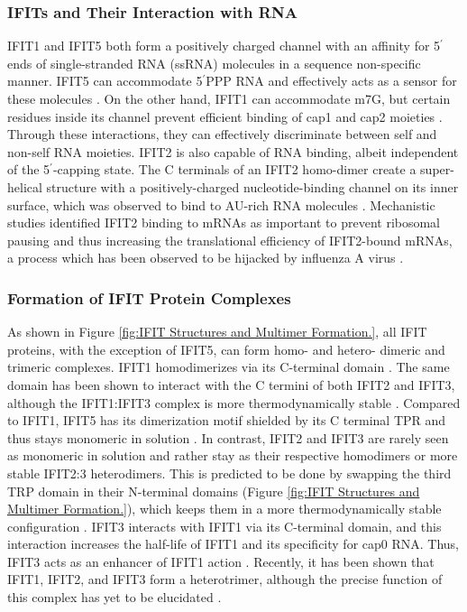 \subsubsection{IFITs and Their Interaction with RNA} \label{IFITs and Their Interaction with RNA}
IFIT1 and IFIT5 both form a positively charged channel with an affinity for 5$^{\prime}$ ends of single-stranded RNA (ssRNA) molecules in a sequence non-specific manner. IFIT5 can accommodate 5$^{\prime}$PPP RNA and effectively acts as a sensor for these molecules \cite{Abbas2013StructuralProteins, Pichlmair2011IFIT1RNA}. On the other hand, IFIT1 can accommodate m7G, but certain residues inside its channel prevent efficient binding of cap1 and cap2 moieties \cite{Diamond2014IFIT1:Translation, Mears2018BetterResponse}. Through these interactions, they can effectively discriminate between self and non-self RNA moieties. IFIT2 is also capable of RNA binding, albeit independent of the 5$^{\prime}$-capping state. The C terminals of an IFIT2 homo-dimer create a super-helical structure with a positively-charged nucleotide-binding channel on its inner surface, which was observed to bind to AU-rich RNA molecules \cite{Yang2012CrystalMechanisms, Vladimer2014IFITs:Proteins}. Mechanistic studies identified IFIT2 binding to mRNAs as important to prevent ribosomal pausing and thus increasing the translational efficiency of IFIT2-bound mRNAs, a process which has been observed to be hijacked by influenza A virus \cite{Tran2020InfluenzaMRNAs}.

\subsubsection{Formation of IFIT Protein Complexes} \label{Formation of IFIT Protein Complexes}
As shown in Figure \ref{fig:IFIT Structures and Multimer Formation.}, all IFIT proteins, with the exception of IFIT5, can form homo- and hetero- dimeric and trimeric complexes. IFIT1 homodimerizes via its C-terminal domain \cite{Abbas2013StructuralProteins}. The same domain has been shown to interact with the C termini of both IFIT2 and IFIT3, although the IFIT1:IFIT3 complex is more thermodynamically stable \cite{Fleith2018IFIT3RNA, Stawowczyk2011TheApoptosis}. Compared to IFIT1, IFIT5 has its dimerization motif shielded by its C terminal TPR and thus stays monomeric in solution \cite{Kumar2014InhibitionMRNAs}. In contrast, IFIT2 and IFIT3 are rarely seen as monomeric in solution and rather stay as their respective homodimers or more stable IFIT2:3 heterodimers. This is predicted to be done by swapping the third TRP domain in their N-terminal domains (Figure \ref{fig:IFIT Structures and Multimer Formation.}), which keeps them in a more thermodynamically stable configuration \cite{Yang2012CrystalMechanisms}. IFIT3 interacts with IFIT1 via its C-terminal domain, and this interaction increases the half-life of IFIT1 and its specificity for cap0 RNA. Thus, IFIT3 acts as an enhancer of IFIT1 action \cite{Fleith2018IFIT3RNA, Johnson2018HumanStability}. Recently, it has been shown that IFIT1, IFIT2, and IFIT3 form a heterotrimer, although the precise function of this complex has yet to be elucidated \cite{Fleith2018IFIT3RNA}. 

